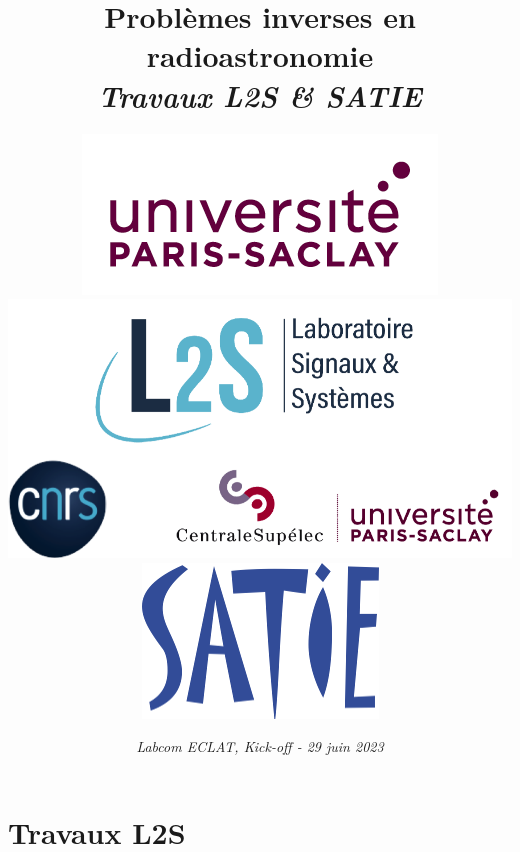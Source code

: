 \documentclass[usenames,dvipsnames]{beamer}
\title[]{\textbf{Problèmes inverses en radioastronomie}\\
\vspace{0.3cm} \textit{Travaux L2S \& SATIE}}
\author[L2S/SATIE]{\includegraphics[height=1.7 cm]{logo-saclay-white.png} \\ \vspace{0.5 cm} \includegraphics[height=1.7 cm]{L2S_tutelles_vertical.pdf}  \hspace{2cm} \includegraphics[height=1.5 cm]{SATIE}
 }
\date[Kick-off ECLAT]{\textit{Labcom ECLAT, Kick-off - 29 juin 2023} }
\begin{document}
%


\frame[plain]{\titlepage}

\section{Travaux L2S}
\end{document}
